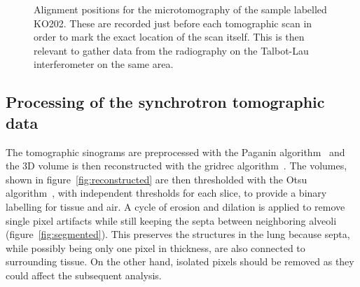 \begin{figure}[htb]
\begin{subfigure}[b]{.49\textwidth}
    \caption{}
    \label{fig:lung-alignment}
    \end{subfigure}
    \caption[Alignment for lung microtomography.]{Alignment positions
    for the microtomography of the sample labelled KO202. These are recorded
just before each tomographic scan in order to mark the exact location of the
scan itself. This is then relevant to gather data from the radiography on
the Talbot-Lau interferometer on the same area.}
\end{figure}

\subsection{Processing of the synchrotron tomographic data}\label{sec:tomoprocessing}
The tomographic sinograms are preprocessed with the Paganin
algorithm~\parencite{Paganin_2002} and
the 3D volume is then reconstructed with the gridrec
algorithm~\parencite{Marone:pp5022}. The volumes, shown in
figure~\ref{fig:reconstructed} are then thresholded with the Otsu
algorithm~\parencite{Otsu_1979}, with independent thresholds for each slice, to
provide a binary labelling for tissue and air. A cycle of
erosion and dilation is applied to remove single pixel artifacts while still
keeping the septa between neighboring alveoli (figure~\ref{fig:segmented}).
This preserves the structures in the lung because septa, while possibly
being only one pixel in thickness, are also connected to surrounding tissue.
On the other hand, isolated pixels should be removed as they could affect
the subsequent analysis.

